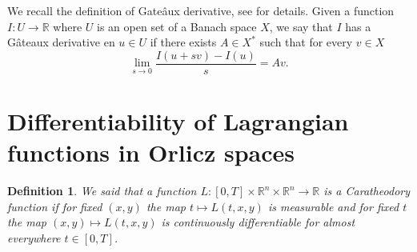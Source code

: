 \documentclass[twoside]{article}
\newtheorem{defi}{Definition}
\begin{document}
We recall the definition of Gate\^{a}ux derivative, see \cite{ambrosetti} for details. Given a function $I:U\to\mathbb{R}$ where $U$ is an open set of a Banach space $X$,
we say that $I$ has a G\^ateaux derivative en $u \in U$ if there exists $A\in X^*$ such that for every $v \in X$
\[
\lim_{s \rightarrow 0}\frac{I(u+sv)-I(u) }{s}=Av.
\]



\section{Differentiability  of Lagrangian functions in Orlicz spaces}

\begin{defi} We said that a function $L:[0,T]\times \mathbb{R}^n \times \mathbb{R}^n \rightarrow \mathbb{R}$ is a Caratheodory function if for fixed $(x,y)$
the map $t \mapsto L(t, x,y)$ is measurable  and for fixed $t$ the map  $(x,y) \mapsto L(t, x, y)$ is continuously differentiable for almost everywhere $t\in [0,T]$.

\end{defi}
\end{document}
